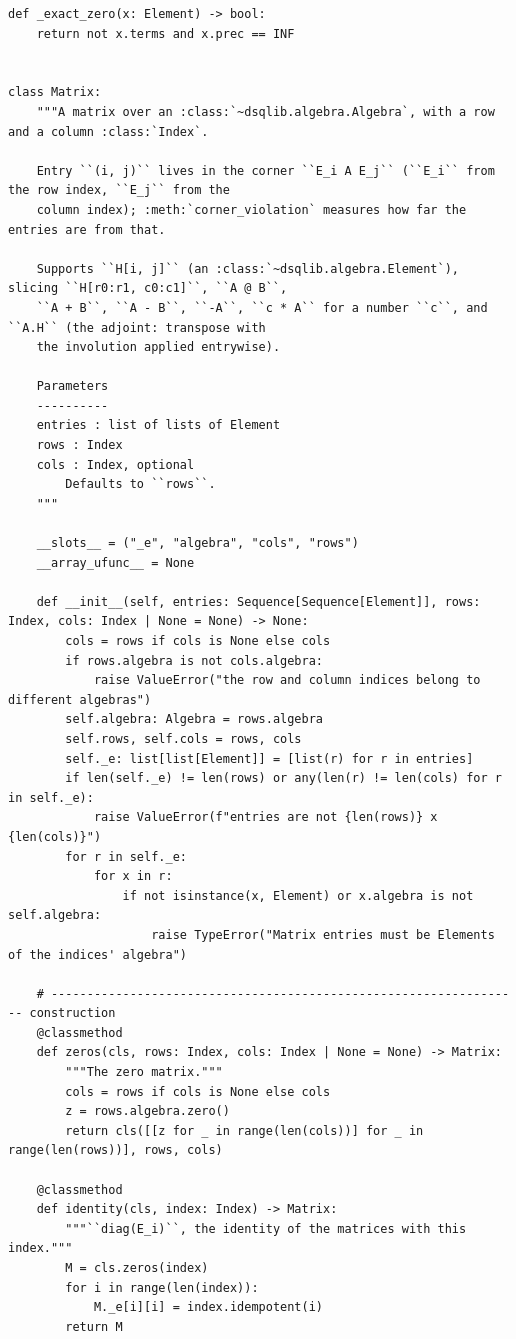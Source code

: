 \documentclass[12pt, a4paper]{report}
\theoremstyle{plain}
\theoremstyle{definition}
\theoremstyle{remark}
\theoremstyle{plain}
\begin{document}
\begin{lstlisting}[style=dsqcode]
def _exact_zero(x: Element) -> bool:
    return not x.terms and x.prec == INF


class Matrix:
    """A matrix over an :class:`~dsqlib.algebra.Algebra`, with a row and a column :class:`Index`.

    Entry ``(i, j)`` lives in the corner ``E_i A E_j`` (``E_i`` from the row index, ``E_j`` from the
    column index); :meth:`corner_violation` measures how far the entries are from that.

    Supports ``H[i, j]`` (an :class:`~dsqlib.algebra.Element`), slicing ``H[r0:r1, c0:c1]``, ``A @ B``,
    ``A + B``, ``A - B``, ``-A``, ``c * A`` for a number ``c``, and ``A.H`` (the adjoint: transpose with
    the involution applied entrywise).

    Parameters
    ----------
    entries : list of lists of Element
    rows : Index
    cols : Index, optional
        Defaults to ``rows``.
    """

    __slots__ = ("_e", "algebra", "cols", "rows")
    __array_ufunc__ = None

    def __init__(self, entries: Sequence[Sequence[Element]], rows: Index, cols: Index | None = None) -> None:
        cols = rows if cols is None else cols
        if rows.algebra is not cols.algebra:
            raise ValueError("the row and column indices belong to different algebras")
        self.algebra: Algebra = rows.algebra
        self.rows, self.cols = rows, cols
        self._e: list[list[Element]] = [list(r) for r in entries]
        if len(self._e) != len(rows) or any(len(r) != len(cols) for r in self._e):
            raise ValueError(f"entries are not {len(rows)} x {len(cols)}")
        for r in self._e:
            for x in r:
                if not isinstance(x, Element) or x.algebra is not self.algebra:
                    raise TypeError("Matrix entries must be Elements of the indices' algebra")

    # ------------------------------------------------------------------ construction
    @classmethod
    def zeros(cls, rows: Index, cols: Index | None = None) -> Matrix:
        """The zero matrix."""
        cols = rows if cols is None else cols
        z = rows.algebra.zero()
        return cls([[z for _ in range(len(cols))] for _ in range(len(rows))], rows, cols)

    @classmethod
    def identity(cls, index: Index) -> Matrix:
        """``diag(E_i)``, the identity of the matrices with this index."""
        M = cls.zeros(index)
        for i in range(len(index)):
            M._e[i][i] = index.idempotent(i)
        return M


\end{lstlisting}
\end{document}
